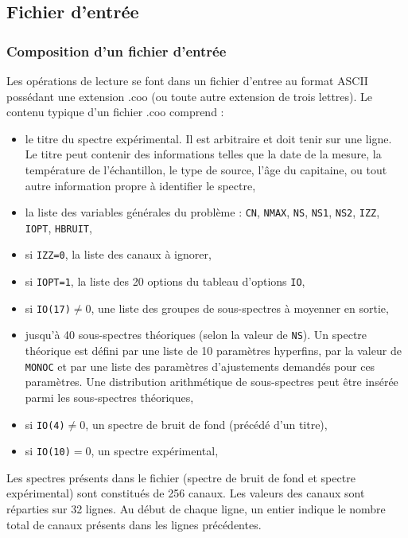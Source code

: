 \subsection{Fichier d'entrée}
\label{part:fichier_entree}
\subsubsection{Composition d'un fichier d'entrée}
Les opérations de lecture se font dans un fichier d'entree au format ASCII possédant une extension .coo (ou toute autre extension de trois lettres).
Le contenu typique d'un fichier .coo comprend :

\begin{itemize}
\item le titre du spectre expérimental. Il est arbitraire et doit tenir sur une ligne.
    Le titre peut contenir des informations telles que la date de la mesure, la température de l'échantillon, le type de source, l'âge du capitaine, ou tout autre information propre à identifier le spectre,
\item la liste des variables générales du problème : \lstinline{CN}, \lstinline{NMAX}, \lstinline{NS}, \lstinline{NS1}, \lstinline{NS2}, \lstinline{IZZ}, \lstinline{IOPT}, \lstinline{HBRUIT},
\item si \lstinline{IZZ=0}, la liste des canaux à ignorer,
\item si \lstinline{IOPT=1}, la liste des 20 options du tableau d'options \lstinline{IO},
\item si \lstinline{IO(17)}$\neq 0$, une liste des groupes de sous-spectres à moyenner en sortie,
\item jusqu'à 40 sous-spectres théoriques (selon la valeur de \lstinline{NS}).
Un spectre théorique est défini par une liste de 10 paramètres hyperfins, par la valeur de \lstinline{MONOC} et par une liste des paramètres d'ajustements demandés pour ces paramètres.
    Une distribution arithmétique de sous-spectres peut être insérée parmi les sous-spectres théoriques,
\item si \lstinline{IO(4)}$\neq 0 $, un spectre de bruit de fond (précédé d'un titre),
\item si \lstinline{IO(10)}$=0$, un spectre expérimental,
\end{itemize}
Les spectres présents dans le fichier (spectre de bruit de fond et spectre expérimental) sont constitués de 256 canaux.
Les valeurs des canaux sont réparties sur 32 lignes.
 Au début de chaque ligne, un entier indique le nombre total de canaux présents dans les lignes précédentes. 


